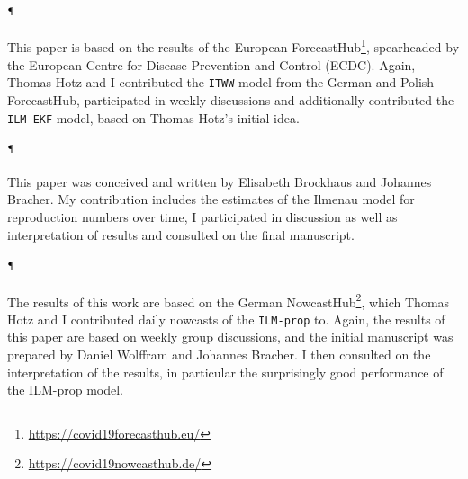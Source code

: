 \begin{refsection}
\paragraph{\cite{Sherratt2022Predictive}$^\mathparagraph$}
This paper is based on the results of the  European ForecastHub\footnote{\url{https://covid19forecasthub.eu/}}, spearheaded by the European Centre for Disease Prevention and Control (ECDC). Again, Thomas Hotz and I contributed the \texttt{ITWW} model from the German and Polish ForecastHub, participated in weekly discussions and additionally contributed the \texttt{ILM-EKF} model, based on Thomas Hotz's initial idea. 



\paragraph{\cite{Brockhaus2023Why}$^\mathparagraph$}
This paper was conceived and written by Elisabeth Brockhaus and Johannes Bracher. My contribution includes the estimates of the Ilmenau model for reproduction numbers over time, I participated in discussion as well as interpretation of results and consulted on the final manuscript. 

\paragraph{\cite{Wolffram2023Collaborative}$^\mathparagraph$}
The results of this work are based on the German NowcastHub\footnote{\url{https://covid19nowcasthub.de/}}, which Thomas Hotz and I contributed daily nowcasts of the \texttt{ILM-prop} to. Again, the results of this paper are based on weekly group discussions, and the initial manuscript was prepared by Daniel Wolffram and Johannes Bracher. I then consulted on the interpretation of the results, in particular the surprisingly good performance of the ILM-prop model.\\[18pt]

\printbibliography[heading=custom, title={Own publications}]
\end{refsection}

